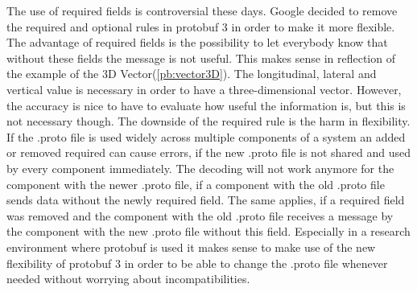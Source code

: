 The use of required fields is controversial these days.\cite{requiredRemoval} Google decided to remove the required and optional rules in protobuf 3 in order to make it more flexible. The advantage of required fields is the possibility to let everybody know that without these fields the message is not useful. This makes sense in reflection of the example of the 3D Vector(\ref{pb:vector3D}). The longitudinal, lateral and vertical value is necessary in order to have a three-dimensional vector. However, the accuracy is nice to have to evaluate how useful the information is, but this is not necessary though. The downside of the required rule is the harm in flexibility. If the .proto file is used widely across multiple components of a system an added or removed required can cause errors, if the new .proto file is not shared and used by every component immediately. The decoding will not work anymore for the component with the newer .proto file, if a component with the old .proto file sends data without the newly required field. The same applies, if a required field was removed and the component with the old .proto file receives a message by the component with the new .proto file without this field. Especially in a research environment where protobuf is used it makes sense to make use of the new flexibility of protobuf 3 in order to be able to change the .proto file whenever needed without worrying about incompatibilities.
